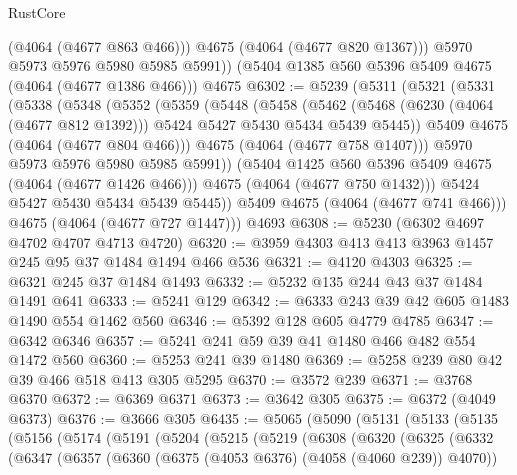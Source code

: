 \begin{lexlean}{RustCore}
\begin{coremodule}
            (@4064 (@4677 @863 @466)))
          @4675
          (@4064 (@4677 @820 @1367)))
        @5970
        @5973
        @5976
        @5980
        @5985
        @5991))
    (@5404 @1385 @560 @5396 @5409 @4675 (@4064 (@4677 @1386 @466)))
    @4675
@6302 := @5239
    (@5311
      (@5321
        (@5331
          (@5338
            (@5348
              (@5352
                (@5359
                  (@5448
                    (@5458
                      (@5462
                        (@5468
                          (@6230 (@4064 (@4677 @812 @1392)))
                          @5424
                          @5427
                          @5430
                          @5434
                          @5439
                          @5445))
                      @5409
                      @4675
                      (@4064 (@4677 @804 @466)))
                    @4675
                    (@4064 (@4677 @758 @1407)))
                  @5970
                  @5973
                  @5976
                  @5980
                  @5985
                  @5991))
              (@5404 @1425 @560 @5396 @5409 @4675 (@4064 (@4677 @1426 @466)))
              @4675
              (@4064 (@4677 @750 @1432)))
            @5424
            @5427
            @5430
            @5434
            @5439
            @5445))
        @5409
        @4675
        (@4064 (@4677 @741 @466)))
      @4675
      (@4064 (@4677 @727 @1447)))
    @4693
@6308 := @5230 (@6302 @4697 @4702 @4707 @4713 @4720)
@6320 := @3959 @4303 @413 @413 @3963 @1457 @245 @95 @37 @1484 @1494 @466 @536
@6321 := @4120 @4303
@6325 := @6321 @245 @37 @1484 @1493
@6332 := @5232 @135 @244 @43 @37 @1484 @1491 @641
@6333 := @5241 @129
@6342 := @6333 @243 @39 @42 @605 @1483 @1490 @554 @1462 @560
@6346 := @5392 @128 @605 @4779 @4785
@6347 := @6342 @6346
@6357 := @5241 @241 @59 @39 @41 @1480 @466 @482 @554 @1472 @560
@6360 := @5253 @241 @39 @1480
@6369 := @5258 @239 @80 @42 @39 @466 @518 @413 @305 @5295
@6370 := @3572 @239
@6371 := @3768 @6370
@6372 := @6369 @6371
@6373 := @3642 @305
@6375 := @6372 (@4049 @6373)
@6376 := @3666 @305
@6435 := @5065
    (@5090
      (@5131
        (@5133
          (@5135
            (@5156
              (@5174
                (@5191
                  (@5204
                    (@5215
                      (@5219
                        (@6308
                          (@6320
                            (@6325
                              (@6332
                                (@6347
                                  (@6357
                                    (@6360 (@6375 (@4053 @6376) (@4058 (@4060 @239)) @4070))

\end{coremodule}
\end{lexlean}
